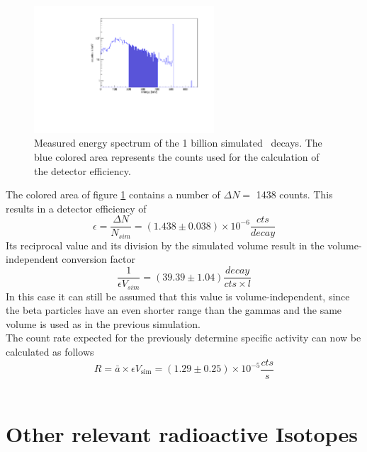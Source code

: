 \documentclass[encoding=utf8,british]{tumphthesis}
\begin{document}
\begin{figure}[t!]
\centering
		\includegraphics[width=0.6\textwidth]{./Bilder/Sim1Phasenraum.pdf}
		\caption{
			Measured energy spectrum of the 1 billion simulated \Kr\ decays. 
			The blue colored area represents the counts used for the calculation of the detector efficiency.
		}
		\label{fig:Sim1Spektrum}
		\vspace{5mm}
\end{figure}


The colored area of figure \ref{fig:Sim1Spektrum} contains a number of $\Delta N =$ 1438 counts.
This results in a detector efficiency of 
\begin{equation*}
\epsilon = \frac{\Delta N}{N_{\unit{sim}}} = (1.438 \pm 0.038) \times 10^{-6} \frac{\unit{cts}}{\unit{decay}}
\end{equation*}
Its reciprocal value and its division by the simulated volume result in the volume-independent conversion factor
\begin{equation*}
\frac{1}{\epsilon V_{\unit{sim}}} = (39.39 \pm 1.04) \frac{\unit{decay}}{\unit{cts \times l}}
\end{equation*}
In this case it can still be assumed that this value is volume-independent, since the beta particles have an even shorter range than the gammas and the same volume is used as in the previous simulation.
\\

The count rate expected for the previously determine specific activity can now be calculated as follows
\begin{equation*}
R = \bar{a} \times  \epsilon V_{\mathrm{sim}} =  (1.29\pm0.25) \times 10^{-5} \frac{\unit{cts}}{\unit{s}}
\end{equation*}
\\

\section{Other relevant radioactive Isotopes}
\label{sec:other}
\end{document}

